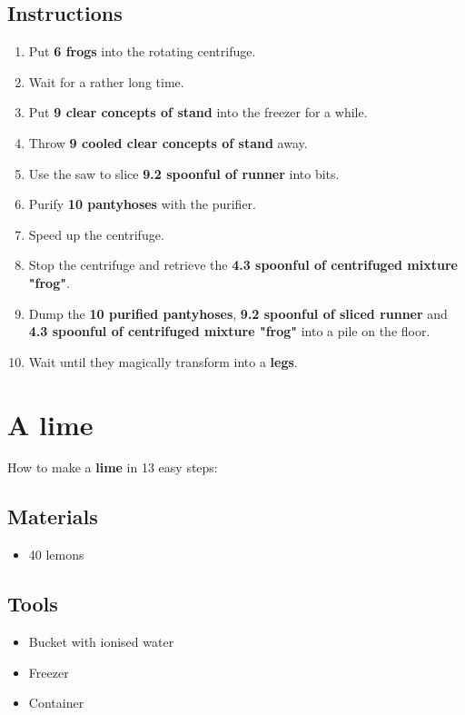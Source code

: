 \documentclass{article}
\begin{document}
\subsection{Instructions}\begin{enumerate}
\item 
Put \textbf{6 frogs} into the rotating centrifuge.
\item 
Wait for a rather long time.
\item 
Put \textbf{9 clear concepts of stand} into the freezer for a while.
\item 
Throw \textbf{9 cooled clear concepts of stand} away.
\item 
Use the saw to slice \textbf{9.2 spoonful of runner} into bits.
\item 
Purify \textbf{10 pantyhoses} with the purifier.
\item 
Speed up the centrifuge.
\item 
Stop the centrifuge and retrieve the \textbf{4.3 spoonful of centrifuged mixture "frog"}.
\item 
Dump the \textbf{10 purified pantyhoses}, \textbf{9.2 spoonful of sliced runner} and \textbf{4.3 spoonful of centrifuged mixture "frog"} into a pile on the floor.
\item 
Wait until they magically transform into a \textbf{legs}.
\end{enumerate}
\newpage
\section{A lime}How to make a \textbf{lime} in 13 easy steps:

\subsection{Materials}\begin{itemize}
\item 
40 lemons
\end{itemize}
\subsection{Tools}\begin{itemize}
\item 
Bucket with ionised water
\item 
Freezer
\item 
Container
\end{itemize}
\end{document}
